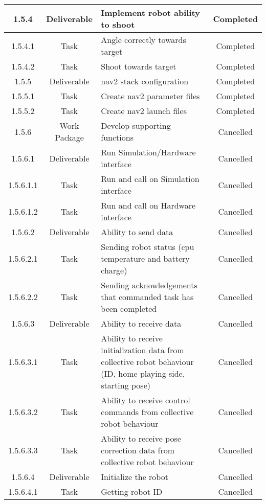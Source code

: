 \begin{longtable}{|c|c|m{}|c|}
    \rowcolor{d} 1.5.4 & Deliverable & Implement robot ability to shoot & Completed \\ \hline
    \rowcolor{d} 1.5.4.1 & Task & Angle correctly towards target & Completed \\ \hline
    \rowcolor{d} 1.5.4.2 & Task & Shoot towards target & Completed \\ \hline
    \rowcolor{d} 1.5.5 & Deliverable & nav2 stack configuration & Completed \\ \hline
    \rowcolor{d} 1.5.5.1 & Task & Create nav2 parameter files & Completed \\ \hline
    \rowcolor{d} 1.5.5.2 & Task & Create nav2 launch files & Completed \\ \hline
    \rowcolor{c} 1.5.6 & Work Package & Develop supporting functions & Cancelled \\ \hline
    \rowcolor{c} 1.5.6.1 & Deliverable & Run Simulation/Hardware interface & Cancelled \\ \hline
    \rowcolor{c} 1.5.6.1.1 & Task & Run and call on Simulation interface & Cancelled \\ \hline
    \rowcolor{c} 1.5.6.1.2 & Task & Run and call on Hardware interface & Cancelled \\ \hline
    \rowcolor{c} 1.5.6.2 & Deliverable & Ability to send data & Cancelled \\ \hline
    \rowcolor{c} 1.5.6.2.1 & Task & Sending robot status (\acs{cpu} temperature and battery charge) & Cancelled \\ \hline
    \rowcolor{c} 1.5.6.2.2 & Task & Sending acknowledgements that commanded task has been completed & Cancelled \\ \hline
    \rowcolor{c} 1.5.6.3 & Deliverable & Ability to receive data & Cancelled \\ \hline
    \rowcolor{c} 1.5.6.3.1 & Task & Ability to receive initialization data from collective robot behaviour (ID, home playing side, starting pose) & Cancelled \\ \hline
    \rowcolor{c}1.5.6.3.2 & Task & Ability to receive control commands from collective robot behaviour & Cancelled \\ \hline
    \rowcolor{c} 1.5.6.3.3 & Task & Ability to receive pose correction data from collective robot behaviour & Cancelled \\ \hline
    \rowcolor{c} 1.5.6.4 & Deliverable & Initialize the robot & Cancelled \\ \hline
    \rowcolor{c} 1.5.6.4.1 & Task & Getting robot ID & Cancelled \\ \hline

\end{longtable}
